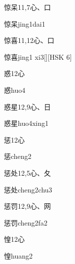 \begin{entry}{惊呆}{11,7}{⼼、⼝}
  \begin{phonetics}{惊呆}{jing1dai1}
  \end{phonetics}
\end{entry}

\begin{entry}{惊喜}{11,12}{⼼、⼝}
  \begin{phonetics}{惊喜}{jing1 xi3}[][HSK 6]
  \end{phonetics}
\end{entry}

\begin{entry}{惑}{12}{⼼}
  \begin{phonetics}{惑}{huo4}
  \end{phonetics}
\end{entry}

\begin{entry}{惑星}{12,9}{⼼、⽇}
  \begin{phonetics}{惑星}{huo4xing1}
  \end{phonetics}
\end{entry}

\begin{entry}{惩}{12}{⼼}
  \begin{phonetics}{惩}{cheng2}
  \end{phonetics}
\end{entry}

\begin{entry}{惩处}{12,5}{⼼、⼡}
  \begin{phonetics}{惩处}{cheng2chu3}
  \end{phonetics}
\end{entry}

\begin{entry}{惩罚}{12,9}{⼼、⽹}
  \begin{phonetics}{惩罚}{cheng2fa2}
  \end{phonetics}
\end{entry}

\begin{entry}{惶}{12}{⼼}
  \begin{phonetics}{惶}{huang2}
  \end{phonetics}
\end{entry}

